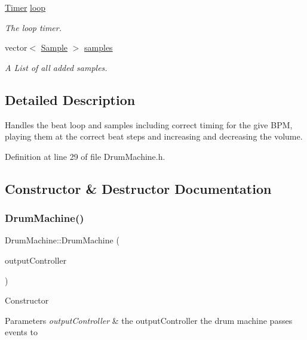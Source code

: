 \begin{DoxyCompactItemize}
\hyperlink{class_timer}{Timer} \hyperlink{class_drum_machine_ab190b1b114840e3fb41fff54d0099e93}{loop}
\begin{DoxyCompactList}\small\item\em The loop timer. \end{DoxyCompactList}\item 
vector$<$ \hyperlink{class_sample}{Sample} $>$ \hyperlink{class_drum_machine_acf215ead70c41e760556497281aa562e}{samples}
\begin{DoxyCompactList}\small\item\em A List of all added samples. \end{DoxyCompactList}\end{DoxyCompactItemize}


\subsection{Detailed Description}
Handles the beat loop and samples including correct timing for the give B\+PM, playing them at the correct beat steps and increasing and decreasing the volume. 

Definition at line 29 of file Drum\+Machine.\+h.



\subsection{Constructor \& Destructor Documentation}
\mbox{\label{class_drum_machine_acacd501a2615a2f0215c04873860ce98}} 
\subsubsection{\texorpdfstring{Drum\+Machine()}{DrumMachine()}}
{\footnotesize\ttfamily Drum\+Machine\+::\+Drum\+Machine (\begin{DoxyParamCaption}\item[{\hyperlink{class_a_output_controller}{A\+Output\+Controller} \&}]{output\+Controller }\end{DoxyParamCaption})\hspace{0.3cm}{\ttfamily [explicit]}}

Constructor 
\begin{DoxyParams}{Parameters}
{\em output\+Controller} & the output\+Controller the drum machine passes events to \\
\hline
\end{DoxyParams}


